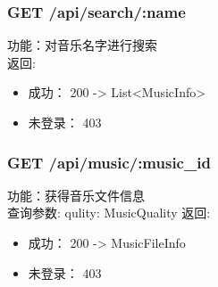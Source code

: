 \subsubsection{GET /api/search/:name}

\noindent
功能：对音乐名字进行搜索\\
返回:
\begin{itemize}
	\item 成功： 200 -> List<MusicInfo>
	\item 未登录： 403
\end{itemize}

\subsubsection{GET /api/music/:music\_id}

\noindent
功能：获得音乐文件信息\\
查询参数: qulity: MusicQuality
返回:
\begin{itemize}
	\item 成功： 200 -> MusicFileInfo
	\item 未登录： 403
\end{itemize}



